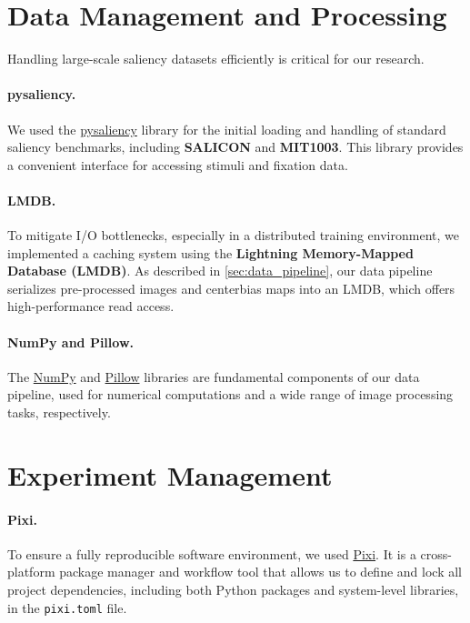 \section{Data Management and Processing}
Handling large-scale saliency datasets efficiently is critical for our research.

\paragraph{pysaliency.} We used the \href{https://github.com/matthias-k/pysaliency}{pysaliency} library for the initial loading and handling of standard saliency benchmarks, including \textbf{SALICON} and \textbf{MIT1003}. This library provides a convenient interface for accessing stimuli and fixation data.

\paragraph{LMDB.} To mitigate I/O bottlenecks, especially in a distributed training environment, we implemented a caching system using the \textbf{Lightning Memory-Mapped Database (LMDB)}. As described in \cref{sec:data_pipeline}, our data pipeline serializes pre-processed images and centerbias maps into an LMDB, which offers high-performance read access.

\paragraph{NumPy and Pillow.} The \href{https://numpy.org/}{NumPy} and \href{https://python-pillow.org/}{Pillow} libraries are fundamental components of our data pipeline, used for numerical computations and a wide range of image processing tasks, respectively.

\section{Experiment Management}

\paragraph{Pixi.} To ensure a fully reproducible software environment, we used \href{https://pixi.sh/}{Pixi}. It is a cross-platform package manager and workflow tool that allows us to define and lock all project dependencies, including both Python packages and system-level libraries, in the \texttt{pixi.toml} file.

